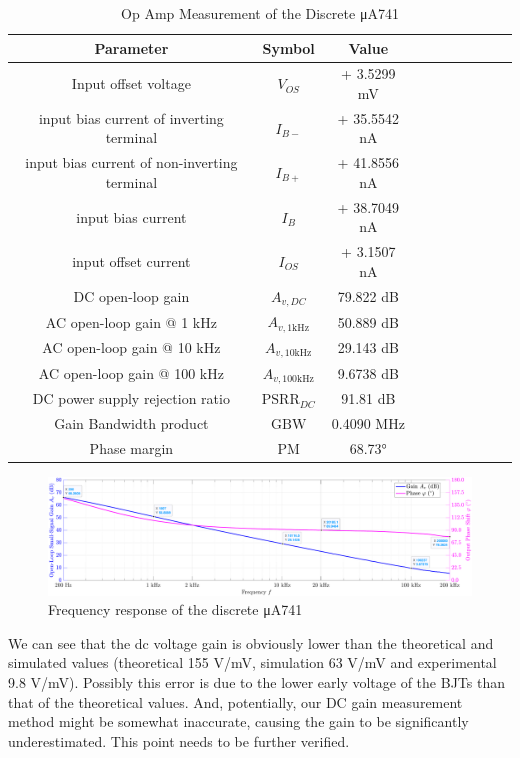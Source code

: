 \documentclass[UTF8]{article}
\begin{document}
\begin{table}[H]\centering
    \caption{Op Amp Measurement of the Discrete μA741}
    \label{Op Amp Measurement of the Discrete μA741}
\begin{tabular}{cccccccccc}\toprule
    Parameter & Symbol & Value \\
    \midrule
    Input offset voltage & $V_{OS}$ & + 3.5299 mV \\
    input bias current of inverting terminal & $I_{B-}$ & + 35.5542 nA \\
    input bias current of non-inverting terminal & $I_{B+}$ & + 41.8556 nA \\
    input bias current & $I_B$ & + 38.7049 nA \\
    input offset current & $I_{OS}$ & + 3.1507 nA \\
    DC open-loop gain & $A_{v,DC}$ & 79.822 dB \\
    AC open-loop gain @ 1 kHz & $A_{v,\mathrm{1kHz}}$ & 50.889 dB \\
    AC open-loop gain @ 10 kHz & $A_{v,\mathrm{10kHz}}$ & 29.143 dB \\
    AC open-loop gain @ 100 kHz & $A_{v,\mathrm{100kHz}}$ & 9.6738 dB \\
    DC power supply rejection ratio & $\mathrm{PSRR}_{DC}$ & 91.81 dB \\
    Gain Bandwidth product & $\mathrm{GBW}$ & 0.4090 MHz \\
    Phase margin & $\mathrm{PM}$ & 68.73° \\
    \bottomrule
\end{tabular}
\end{table}

\begin{figure}[H]\centering
    \includegraphics[width=\columnwidth]{LCE-06-07-运放设计/assets/uA741/test/2025-05-19_18-56-03.pdf}
    \caption{Frequency response of the discrete μA741}
\end{figure}

We can see that the dc voltage gain is obviously lower than the theoretical and simulated values (theoretical 155 V/mV, simulation 63 V/mV and experimental 9.8 V/mV). Possibly this error is due to the lower early voltage of the BJTs than that of the theoretical values. And, potentially, our DC gain measurement method might be somewhat inaccurate, causing the gain to be significantly underestimated. This point needs to be further verified.
\end{document}

